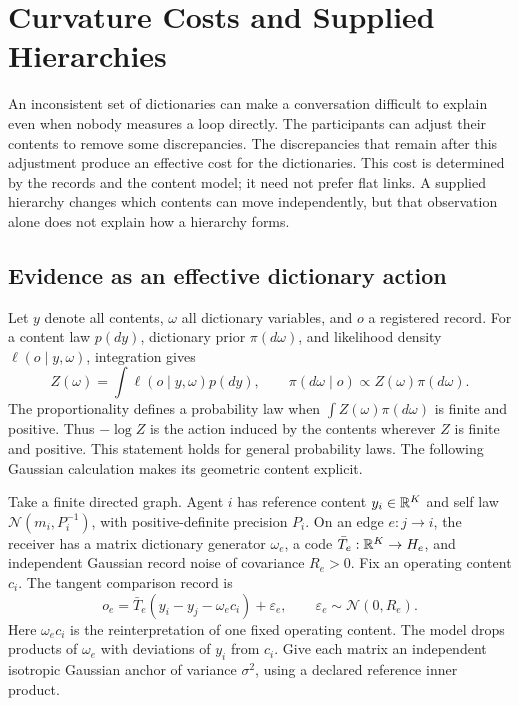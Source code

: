 \chapter{Curvature Costs and Supplied Hierarchies}
\label{c19:curvature-hierarchy}

An inconsistent set of dictionaries can make a conversation difficult to explain even when nobody measures a loop directly. The participants can adjust their contents to remove some discrepancies. The discrepancies that remain after this adjustment produce an effective cost for the dictionaries. This cost is determined by the records and the content model; it need not prefer flat links. A supplied hierarchy changes which contents can move independently, but that observation alone does not explain how a hierarchy forms.

\section{Evidence as an effective dictionary action}

Let $y$ denote all contents, $\omega$ all dictionary variables, and $o$ a registered record. For a content law $p(dy)$, dictionary prior $\pi(d\omega)$, and likelihood density $\ell(o\mid y,\omega)$, integration gives
\begin{equation}
Z(\omega)=\int\ell(o\mid y,\omega)p(dy),\qquad
\pi(d\omega\mid o)\propto Z(\omega)\pi(d\omega).
\label{c19:evidence}
\end{equation}
The proportionality defines a probability law when $\int Z(\omega)\pi(d\omega)$ is finite and positive. Thus $-\log Z$ is the action induced by the contents wherever $Z$ is finite and positive. This statement holds for general probability laws. The following Gaussian calculation makes its geometric content explicit.

Take a finite directed graph. Agent $i$ has reference content $y_i\in\mathbb R^K$ and self law $\mathcal N(m_i,P_i^{-1})$, with positive-definite precision $P_i$. On an edge $e:j\to i$, the receiver has a matrix dictionary generator $\omega_e$, a code $\bar T_e:\mathbb R^K\to H_e$, and independent Gaussian record noise of covariance $R_e>0$. Fix an operating content $c_i$. The tangent comparison record is
\begin{equation}
o_e=\bar T_e(y_i-y_j-\omega_ec_i)+\varepsilon_e,
\qquad \varepsilon_e\sim\mathcal N(0,R_e).
\label{c19:record}
\end{equation}
Here $\omega_ec_i$ is the reinterpretation of one fixed operating content. The model drops products of $\omega_e$ with deviations of $y_i$ from $c_i$. Give each matrix an independent isotropic Gaussian anchor of variance $\sigma^2$, using a declared reference inner product.

